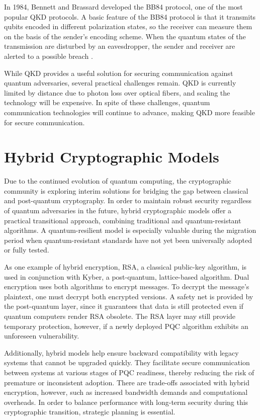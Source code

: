 \documentclass[conference]{IEEEtran}
\begin{document}
In 1984, Bennett and Brassard developed the BB84 protocol, one of the most popular QKD protocols. A basic feature of the BB84 protocol is that it transmits qubits encoded in different polarization states, so the receiver can measure them on the basis of the sender's encoding scheme. When the quantum states of the transmission are disturbed by an eavesdropper, the sender and receiver are alerted to a possible breach \cite{Bennett1992}.

While QKD provides a useful solution for securing communication against quantum adversaries, several practical challenges remain. QKD is currently limited by distance due to photon loss over optical fibers, and scaling the technology will be expensive. In spite of these challenges, quantum communication technologies will continue to advance, making QKD more feasible for secure communication.

\section{Hybrid Cryptographic Models}

Due to the continued evolution of quantum computing, the cryptographic community is exploring interim solutions for bridging the gap between classical and post-quantum cryptography. In order to maintain robust security regardless of quantum adversaries in the future, hybrid cryptographic models offer a practical transitional approach, combining traditional and quantum-resistant algorithms. A quantum-resilient model is especially valuable during the migration period when quantum-resistant standards have not yet been universally adopted or fully tested.

As one example of hybrid encryption, RSA, a classical public-key algorithm, is used in conjunction with Kyber, a post-quantum, lattice-based algorithm. Dual encryption uses both algorithms to encrypt messages. To decrypt the message's plaintext, one must decrypt both encrypted versions. A safety net is provided by the post-quantum layer, since it guarantees that data is still protected even if quantum computers render RSA obsolete. The RSA layer may still provide temporary protection, however, if a newly deployed PQC algorithm exhibits an unforeseen vulnerability.

Additionally, hybrid models help ensure backward compatibility with legacy systems that cannot be upgraded quickly. They facilitate secure communication between systems at various stages of PQC readiness, thereby reducing the risk of premature or inconsistent adoption. There are trade-offs associated with hybrid encryption, however, such as increased bandwidth demands and computational overheads. In order to balance performance with long-term security during this cryptographic transition, strategic planning is essential.
\end{document}

